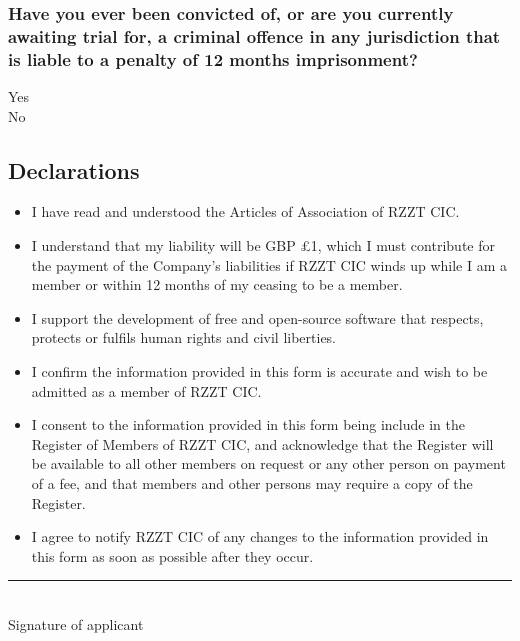 \documentclass[a4paper,10pt]{article}
\begin{document}
\begin{Form}
\begin{framed}%
  \TextField[width=\textwidth,donotscroll=true,multiline=true,name=reasons]{ }%
\end{framed}%

\subsubsection{Have you ever been convicted of, or are you currently awaiting trial for, a criminal offence in any jurisdiction that is liable to a penalty of 12 months imprisonment?}

\ChoiceMenu[radio,radiosymbol=\ding{108},name=criminaloffenceradio]{ }{ }Yes\\\vspace{0.5em}
\ChoiceMenu[radio,radiosymbol=\ding{108},name=criminaloffenceradio]{ }{ }No

\begin{framed}%
  \TextField[width=\textwidth,donotscroll=true,multiline=true,name=criminaloffence]{ }%
\end{framed}%

\subsection{Declarations}

\begin{itemize}
  \renewcommand{\labelitemi}{\CheckBox[name=articles]{ }}
  \item I have read and understood the Articles of Association of RZZT CIC.
  \renewcommand{\labelitemi}{\CheckBox[name=liability]{ }}
  \item I understand that my liability will be GBP £1, which I must contribute for the payment of the Company's liabilities if RZZT CIC winds up while I am a member or within 12 months of my ceasing to be a member.
  \renewcommand{\labelitemi}{\CheckBox[name=supportfoss]{ }}
  \item I support the development of free and open-source software that respects, protects or fulfils human rights and civil liberties.
  \renewcommand{\labelitemi}{\CheckBox[name=infoaccurate]{ }}
  \item I confirm the information provided in this form is accurate and wish to be admitted as a member of RZZT CIC.
  \renewcommand{\labelitemi}{\CheckBox[name=consent]{ }}
  \item I consent to the information provided in this form being include in the Register of Members of RZZT CIC, and acknowledge that the Register will be available to all other members on request or any other person on payment of a fee, and that members and other persons may require a copy of the Register.
  \renewcommand{\labelitemi}{\CheckBox[name=notify]{ }}
  \item I agree to notify RZZT CIC of any changes to the information provided in this form as soon as possible after they occur.
\end{itemize}

\vspace{\fill}
\rule{0.5\textwidth}{0.5pt}\\
Signature of applicant

\end{Form}
\end{document}
